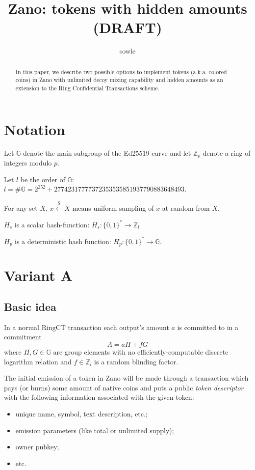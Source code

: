 \documentclass{article}
\title{\huge{Zano: tokens with hidden amounts \\ (DRAFT)}}
\author{sowle}
\begin{document}
\maketitle

\begin{abstract}
    In this paper, we describe two possible options to implement tokens (a.k.a. colored coins) in Zano with unlimited decoy mixing capability and hidden amounts as an extension to the Ring Confidential Transactions scheme.
\end{abstract}

\section{Notation}
Let $\mathbb{G}$ denote the main subgroup of the Ed25519 curve and let $\mathbb{Z}_p$ denote a ring of integers modulo $p$.

Let $l$ be the order of $\mathbb{G}$: $l = \#\mathbb{G} = 2^{252} + 27742317777372353535851937790883648493$.

For  any  set $X$, $x \stackrel{\$}{\leftarrow} X$ means uniform  sampling of $x$ at random from $X$. 

$H_s$ is a scalar hash-function: $H_s:\{0,1\}^* \to \mathbb{Z}_l$

$H_p$ is a deterministic hash function: $H_p:\{0,1\}^* \to \mathbb{G}$.

\section{Variant A}
\subsection{Basic idea}
In a normal RingCT transaction each output's amount $a$ is committed to in a commitment
\[ A = aH + fG \]
where $H, G \in \mathbb{G}$ are group elements with no efficiently-computable discrete logarithm relation and $f \in \mathbb{Z}_l$ is a random blinding factor.

The initial emission of a token in Zano will be made through a transaction which pays (or burns) some amount of native coins and puts a public \textit{token descriptor} with the following information associated with the given token:
\begin{itemize}
    \item unique name, symbol, text description, etc.;
    \item emission parameters (like total or unlimited supply);
    \item owner pubkey;
    \item etc.
\end{itemize}
\end{document}
